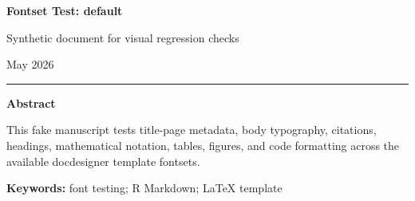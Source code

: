 \documentclass[12pt]{article}
\newif\ifdocdesigneranon
\begin{document}
\begin{titlepage}
\thispagestyle{empty}
\vspace*{0.12\textheight}
\begin{center}
\begin{singlespace}

{\LARGE\bfseries Fontset Test: default\par}

\vspace{0.35em}
{\large Synthetic document for visual regression checks\par}

\vspace{2.2em}

\docdesignerauthorblock

\par\vspace{1.5\baselineskip}
\docdesignerseriesblock

\ifdocdesigneranon\else
\vspace{0.35em}
{\small May 2026}\par
\fi

\vspace{2.2\baselineskip}
\noindent\rule{0.35\textwidth}{0.4pt}\par
\vspace{0.65em}
\begin{minipage}{0.78\textwidth}
\small\singlespacing
\textbf{Abstract}\par\vspace{0.3em}
This fake manuscript tests title-page metadata, body typography,
citations, headings, mathematical notation, tables, figures, and code
formatting across the available docdesigner template fontsets.
\par\vspace{0.6em}
\textbf{Keywords:} font testing; R Markdown; LaTeX template
\end{minipage}

\end{singlespace}
\end{center}
\vfill
\end{titlepage}
\else
\end{document}
